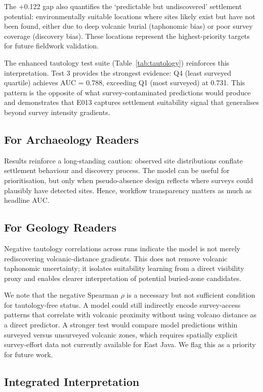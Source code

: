 \documentclass[12pt]{article}
\begin{document}
The $+$0.122 gap also quantifies the `predictable but undiscovered' settlement potential: environmentally suitable locations where sites likely exist but have not been found, either due to deep volcanic burial (taphonomic bias) or poor survey coverage (discovery bias).
These locations represent the highest-priority targets for future fieldwork validation.

The enhanced tautology test suite (Table~\ref{tab:tautology}) reinforces this interpretation.
Test 3 provides the strongest evidence: Q4 (least surveyed quartile) achieves AUC = 0.788, exceeding Q1 (most surveyed) at 0.731.
This pattern is the opposite of what survey-contaminated predictions would produce and demonstrates that E013 captures settlement suitability signal that generalises beyond survey intensity gradients.

\subsection{For Archaeology Readers}

Results reinforce a long-standing caution: observed site distributions conflate settlement behaviour and discovery process.
The model can be useful for prioritisation, but only when pseudo-absence design reflects where surveys could plausibly have detected sites.
Hence, workflow transparency matters as much as headline AUC.

\subsection{For Geology Readers}

Negative tautology correlations across runs indicate the model is not merely rediscovering volcanic-distance gradients.
This does not remove volcanic taphonomic uncertainty; it isolates suitability learning from a direct visibility proxy and enables clearer interpretation of potential buried-zone candidates.

We note that the negative Spearman $\rho$ is a necessary but not sufficient condition for tautology-free status.
A model could still indirectly encode survey-access patterns that correlate with volcanic proximity without using volcano distance as a direct predictor.
A stronger test would compare model predictions within surveyed versus unsurveyed volcanic zones, which requires spatially explicit survey-effort data not currently available for East Java.
We flag this as a priority for future work.

\subsection{Integrated Interpretation}
\end{document}
